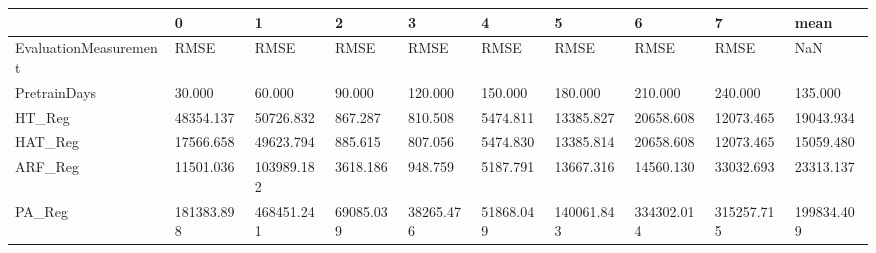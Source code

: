 \begin{tabular}{llllllllll}
\toprule
{} &          0 &          1 &         2 &         3 &         4 &          5 &          6 &          7 &       mean \\
\midrule
EvaluationMeasurement &       RMSE &       RMSE &      RMSE &      RMSE &      RMSE &       RMSE &       RMSE &       RMSE &        NaN \\
PretrainDays          &     30.000 &     60.000 &    90.000 &   120.000 &   150.000 &    180.000 &    210.000 &    240.000 &    135.000 \\
HT\_Reg                &  48354.137 &  50726.832 &   867.287 &   810.508 &  5474.811 &  13385.827 &  20658.608 &  12073.465 &  19043.934 \\
HAT\_Reg               &  17566.658 &  49623.794 &   885.615 &   807.056 &  5474.830 &  13385.814 &  20658.608 &  12073.465 &  15059.480 \\
ARF\_Reg               &  11501.036 & 103989.182 &  3618.186 &   948.759 &  5187.791 &  13667.316 &  14560.130 &  33032.693 &  23313.137 \\
PA\_Reg                & 181383.898 & 468451.241 & 69085.039 & 38265.476 & 51868.049 & 140061.843 & 334302.014 & 315257.715 & 199834.409 \\
\bottomrule
\end{tabular}

